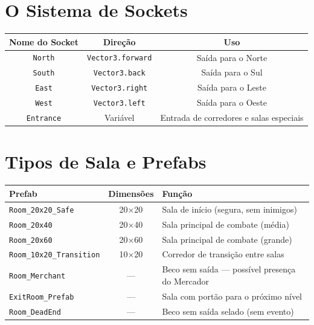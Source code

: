 \documentclass[a4paper,12pt]{report}
\begin{document}
\section{O Sistema de Sockets}
\begin{center}
\begin{tabular}{|c|c|c|}
    \hline
    \textbf{Nome do Socket} & \textbf{Direção} & \textbf{Uso} \\
    \hline
    \texttt{North} & \texttt{Vector3.forward} & Saída para o Norte \\
    \texttt{South} & \texttt{Vector3.back}    & Saída para o Sul  \\
    \texttt{East}  & \texttt{Vector3.right}   & Saída para o Leste \\
    \texttt{West}  & \texttt{Vector3.left}    & Saída para o Oeste \\
    \texttt{Entrance} & Variável & Entrada de corredores e salas especiais \\
    \hline
\end{tabular}
\end{center}

\section{Tipos de Sala e Prefabs}
\begin{center}
\begin{tabular}{|l|c|l|}
    \hline
    \textbf{Prefab} & \textbf{Dimensões} & \textbf{Função} \\
    \hline
    \texttt{Room\_20x20\_Safe}       & 20×20 & Sala de início (segura, sem inimigos) \\
    \texttt{Room\_20x40}             & 20×40 & Sala principal de combate (média) \\
    \texttt{Room\_20x60}             & 20×60 & Sala principal de combate (grande) \\
    \texttt{Room\_10x20\_Transition} & 10×20 & Corredor de transição entre salas \\
    \texttt{Room\_Merchant}          & —     & Beco sem saída — possível presença do Mercador \\
    \texttt{ExitRoom\_Prefab}        & —     & Sala com portão para o próximo nível \\
    \texttt{Room\_DeadEnd}           & —     & Beco sem saída selado (sem evento) \\
    \hline
\end{tabular}
\end{center}
\end{document}
